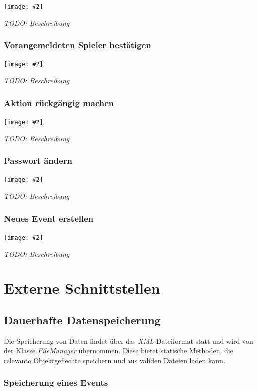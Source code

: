 \documentclass[11pt]{article}
\newcommand{\includediagram}[2]{
	\begin{center}
		\texttt{[image: \#2]}
	\end{center}
}
\begin{document}
\includediagram{1.0}{sequence-add-tournament-module.png}

\textit{TODO: Beschreibung}

\subsubsection{Vorangemeldeten Spieler bestätigen}

\includediagram{1.0}{sequence-verify-registered-player.png}

\textit{TODO: Beschreibung}

\subsubsection{Aktion rückgängig machen}

\includediagram{1.0}{sequence-undo-action.png}

\textit{TODO: Beschreibung}

\subsubsection{Passwort ändern}

\includediagram{1.0}{sequence-change-password.png}

\textit{TODO: Beschreibung}

\subsubsection{Neues Event erstellen}

\includediagram{1.0}{sequence-create-event.png}

\textit{TODO: Beschreibung}

\section{Externe Schnittstellen}

\subsection{Dauerhafte Datenspeicherung}

Die Speicherung von Daten findet über das \textit{XML}-Dateiformat statt und wird von der Klasse \textit{FileManager} übernommen. Diese bietet statische Methoden, die relevante Objektgeflechte speichern und aus validen Dateien laden kann.

\subsubsection{Speicherung eines Events}
\end{document}
